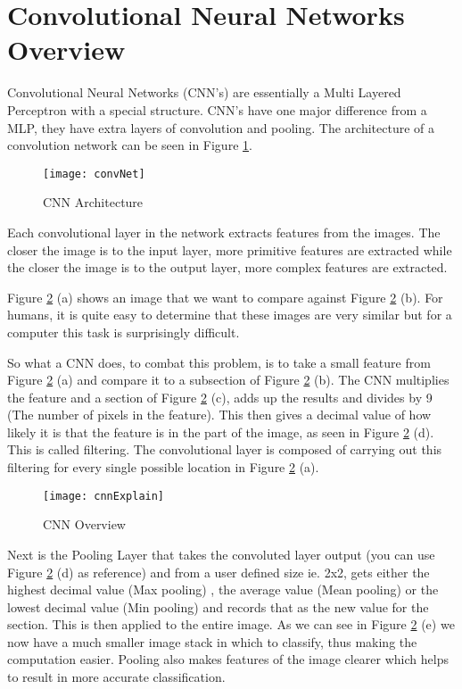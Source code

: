 \section{Convolutional Neural Networks Overview}
Convolutional Neural Networks (CNN's) are essentially a Multi Layered Perceptron with a
special structure. CNN's have one major difference from a MLP, they have extra
layers of convolution and pooling. The architecture of a convolution network can
be seen in Figure \ref{fig:convNet}.

\begin{figure}[h]
	\texttt{[image: convNet]}
	\caption{CNN Architecture}
	\label{fig:convNet}
\end{figure}

Each convolutional layer in the network extracts features from the images.
The closer the image is to the input layer, more primitive features are extracted while
the closer the image is to the output layer, more complex features are extracted.

Figure \ref{fig:cnnExplain} (a) shows an image that we want to compare against
Figure \ref{fig:cnnExplain} (b).
For humans, it is quite easy to determine that these images are very similar but
for a computer this task is surprisingly difficult.

So what a CNN does, to combat this problem, is to take a small feature from
Figure \ref{fig:cnnExplain} (a) and compare it to a subsection of Figure \ref{fig:cnnExplain} (b).
The CNN multiplies the feature and a section of Figure \ref{fig:cnnExplain} (c), adds
up the results and divides by 9 (The number of pixels in the feature). This then gives a decimal value of how likely
it is that the feature is in the part of the image, as seen in Figure
\ref{fig:cnnExplain} (d).
This is called filtering. The convolutional layer is composed of carrying out
this filtering for every single possible location in Figure \ref{fig:cnnExplain} (a).

\begin{figure}
    \texttt{[image: cnnExplain]}
    \caption{CNN Overview}
    \label{fig:cnnExplain}
\end{figure}
Next is the Pooling Layer that takes the convoluted
layer output (you can use Figure \ref{fig:cnnExplain} (d) as reference) and from a
user defined size ie. 2x2, gets either the highest decimal value (Max pooling)
, the average value (Mean pooling) or the lowest decimal value (Min pooling) and records that as the new value for the
section. This is then applied to the entire image. As we can see in Figure
\ref{fig:cnnExplain} (e) we now have a much smaller image stack in which to classify,
thus making the computation easier. Pooling also makes features of the image clearer which helps to result in more accurate classification.

